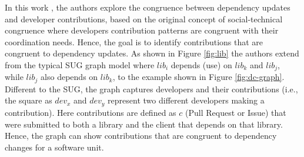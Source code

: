 In this work \cite{wattanakriengkrai2022giving}, the authors explore the congruence between dependency updates and developer contributions, based on the original concept of social-technical congruence \cite{stcCataldo2008} where developers contribution patterns are congruent with their coordination needs. Hence, the goal is to identify contributions that are congruent to dependency updates.
As shown in Figure \ref{fig:lib} the authors extend from the typical SUG graph model where $lib_i$ depends (use) on  $lib_k$ and  $lib_j$, while  $lib_j$ also depends on $lib_k$, to the example shown in Figure \ref{fig:dc-graph}.
Different to the SUG, the graph captures developers and their contributions (i.e., the square as $dev_x$ and $dev_y$ represent two different developers making a contribution).
Here contributions are defined as $c$ (Pull Request or Issue) that were submitted to both a library and the client that depends on that library.
Hence, the graph can show contributions that are congruent to dependency changes for a software unit. 

